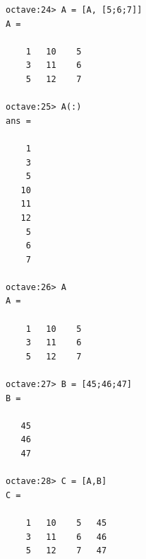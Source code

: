 \documentclass[12pt]{report}
\begin{document}
\begin{lstlisting}[basicstyle=\small]
octave:24> A = [A, [5;6;7]]
A =

    1   10    5
    3   11    6
    5   12    7

octave:25> A(:)
ans =

    1
    3
    5
   10
   11
   12
    5
    6
    7

octave:26> A
A =

    1   10    5
    3   11    6
    5   12    7

octave:27> B = [45;46;47]
B =

   45
   46
   47

octave:28> C = [A,B]
C =

    1   10    5   45
    3   11    6   46
    5   12    7   47


\end{lstlisting}
\end{document}
